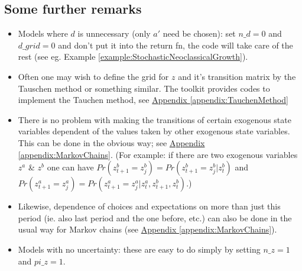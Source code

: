 \subsection{Some further remarks}
\begin{itemize}
 \item Models where $d$ is unnecessary (only $a'$ need be chosen): set $n\_{}d=0$ and $d\_{}grid=0$ and don't put it into the return fn, the code will
    take care of the rest (see eg. Example \ref{example:StochasticNeoclassicalGrowth}).
 \item Often one may wish to define the grid for $z$ and it's transition matrix by the Tauschen method or something similar. The toolkit provides codes to
    implement the Tauchen method, see \hyperref[appendix:TauchenMethod]{Appendix \ref*{appendix:TauchenMethod}}
 \item There is no problem with making the transitions of certain exogenous state variables dependent of the values taken by other exogenous state variables.
    This can be done in the obvious way; see \hyperref[appendix:MarkovChains]{Appendix \ref*{appendix:MarkovChains}}. (For example: if there are two exogenous variables $z^a$ \& $z^b$ one can have $Pr(z^b_{t+1}=z^b_j)=
    Pr(z^b_{t+1}=z^b_j | z^b_t)$ and $Pr(z^a_{t+1}=z^a_j)=Pr(z^a_{t+1}=z^a_j | z^a_t, z^b_{t+1}, z^b_t)$.)
 \item Likewise, dependence of choices and expectations on more than just this period (ie. also last period and the one before, etc.) can also
    be done in the usual way for Markov chains (see \hyperref[appendix:MarkovChains]{Appendix \ref*{appendix:MarkovChains}}).
 \item Models with no uncertainty: these are easy to do simply by setting $n\_{}z=1$ and $pi\_{}z=1$.
\end{itemize}

